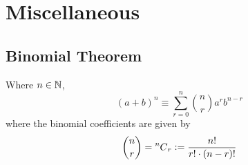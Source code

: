 \section{Miscellaneous}

\subsection{Binomial Theorem}

\begin{theorem} Where \(n \in \mathbb N\),
\begin{equation*}
(a + b)^n \equiv \sum_{r = 0}^n \binom nr a^r b^{n - r}
\end{equation*}
where the binomial coefficients are given by
\begin{equation*}
\binom nr = \prescript{n\mkern-0.5mu}{}C_{r} \vcentcolon= \frac{n!}{r!\cdot(n - r)!}
\end{equation*}
\end{theorem}
